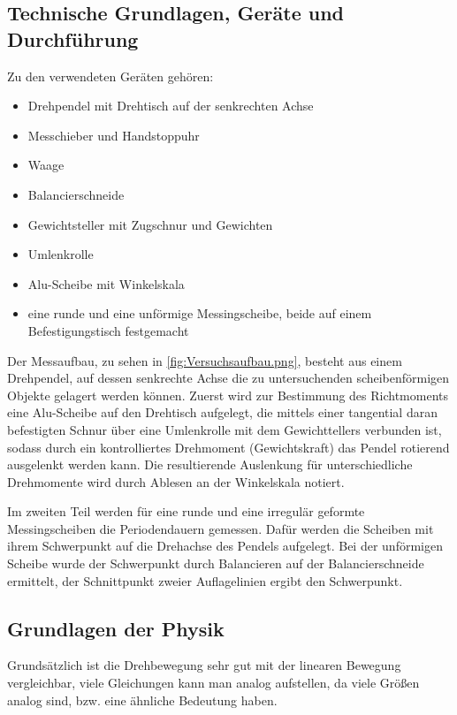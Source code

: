 \subsection{Technische Grundlagen, Geräte und Durchführung}
Zu den verwendeten Geräten gehören:
\begin{itemize}
    \item Drehpendel mit Drehtisch auf der senkrechten Achse 
    \item Messchieber und Handstoppuhr
    \item Waage
    \item Balancierschneide
    \item Gewichtsteller mit Zugschnur und Gewichten
    \item Umlenkrolle
    \item Alu-Scheibe mit Winkelskala 
    \item eine runde und eine unförmige Messingscheibe, beide auf einem Befestigungstisch festgemacht
\end{itemize}

Der Messaufbau, zu sehen in \cref{fig:Versuchsaufbau.png}, besteht aus einem Drehpendel, auf dessen senkrechte Achse die zu untersuchenden scheibenförmigen Objekte gelagert werden können. 
Zuerst wird zur Bestimmung des Richtmoments eine Alu-Scheibe auf den Drehtisch aufgelegt, die mittels einer tangential daran befestigten Schnur über eine Umlenkrolle mit dem Gewichttellers verbunden ist, sodass durch ein kontrolliertes Drehmoment (Gewichtskraft) das Pendel rotierend ausgelenkt werden kann. Die resultierende Auslenkung für unterschiedliche Drehmomente wird durch Ablesen an der Winkelskala notiert.

Im zweiten Teil werden für eine runde und eine irregulär geformte Messingscheiben die Periodendauern gemessen. Dafür werden die Scheiben mit ihrem Schwerpunkt auf die Drehachse des Pendels aufgelegt. Bei der unförmigen Scheibe wurde der Schwerpunkt durch Balancieren auf der Balancierschneide ermittelt, der Schnittpunkt zweier Auflagelinien ergibt den Schwerpunkt.

\FloatBarrier

\subsection[Grundlagen der Physik]{Grundlagen der Physik \autocite{Skript_1}}
Grundsätzlich ist die Drehbewegung sehr gut mit der linearen Bewegung vergleichbar, viele Gleichungen kann man analog aufstellen, da viele Größen analog sind, bzw. eine ähnliche Bedeutung haben.
